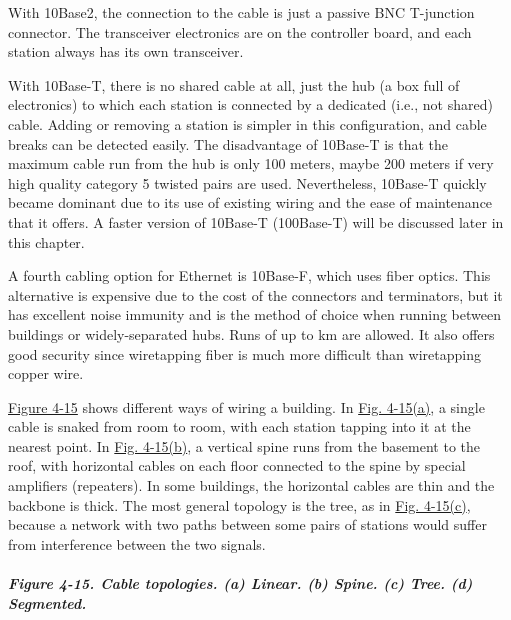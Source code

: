 With 10Base2, the connection to the cable is just a passive BNC
T-junction connector. The transceiver electronics are on the controller
board, and each station always has its own transceiver.

With 10Base-T, there is no shared cable at all, just the hub (a box full
of electronics) to which each station is connected by a dedicated (i.e.,
not shared) cable. Adding or removing a station is simpler in this
configuration, and cable breaks can be detected easily. The disadvantage
of 10Base-T is that the maximum cable run from the hub is only 100
meters, maybe 200 meters if very high quality category 5 twisted pairs
are used. Nevertheless, 10Base-T quickly became dominant due to its use
of existing wiring and the ease of maintenance that it offers. A faster
version of 10Base-T (100Base-T) will be discussed later in this chapter.

A fourth cabling option for Ethernet is {10Base-F}, which uses fiber
optics. This alternative is expensive due to the cost of the connectors
and terminators, but it has excellent noise immunity and is the method
of choice when running between buildings or widely-separated hubs. Runs
of up to km are allowed. It also offers good security since wiretapping
fiber is much more difficult than wiretapping copper wire.

\protect\hyperlink{0130661023_ch04lev1sec3.htmlux5cux23ch04fig15}{Figure
4-15} shows different ways of wiring a building. In
\protect\hyperlink{0130661023_ch04lev1sec3.htmlux5cux23ch04fig15}{Fig.
4-15(a)}, a single cable is snaked from room to room, with each station
tapping into it at the nearest point. In
\protect\hyperlink{0130661023_ch04lev1sec3.htmlux5cux23ch04fig15}{Fig.
4-15(b)}, a vertical spine runs from the basement to the roof, with
horizontal cables on each floor connected to the spine by special
amplifiers (repeaters). In some buildings, the horizontal cables are
thin and the backbone is thick. The most general topology is the tree,
as in
\protect\hyperlink{0130661023_ch04lev1sec3.htmlux5cux23ch04fig15}{Fig.
4-15(c)}, because a network with two paths between some pairs of
stations would suffer from interference between the two signals.

\subparagraph[Figure 4-15. Cable topologies. (a) Linear. (b) Spine. (c)
Tree. (d)
Segmented.]{\texorpdfstring{\protect\hypertarget{0130661023_ch04lev1sec3.htmlux5cux23ch04fig15}{}{}Figure
4-15. Cable topologies. (a) Linear. (b) Spine. (c) Tree. (d)
Segmented.}{Figure 4-15. Cable topologies. (a) Linear. (b) Spine. (c) Tree. (d) Segmented.}}

